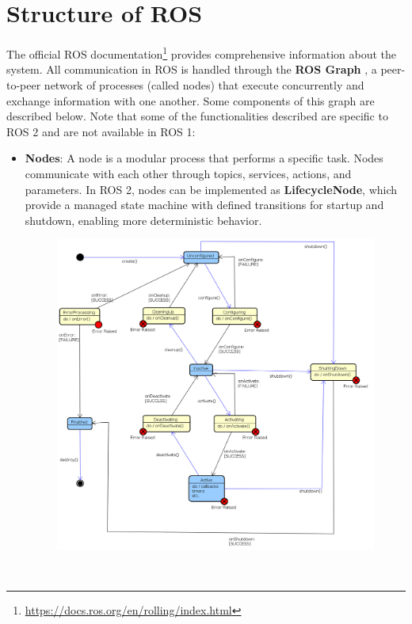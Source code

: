 \section{Structure of ROS}
The official ROS documentation\footnote{\href{https://docs.ros.org/en/rolling/index.html}{https://docs.ros.org/en/rolling/index.html}} provides comprehensive information about the system.  All communication in ROS is handled through the \textbf{ROS Graph} , a peer-to-peer network of processes (called nodes) that execute concurrently and exchange information with one another. Some components of this graph are described below. Note that some of the functionalities described are specific to ROS 2 and are not available in ROS 1:
\begin{itemize}
	\item \textbf{Nodes}: A node is a modular process that performs a specific task. Nodes communicate with each other through topics, services, actions, and parameters. In ROS 2, nodes can be implemented as \textbf{LifecycleNode}\label{LifecycleNode}, which provide a managed state machine with defined transitions for startup and shutdown, enabling more deterministic behavior.
	\begin{figure}[h]
	\centering
	\includegraphics[width=1\linewidth]{img/life_cycle_sm_nf.png}
	\end{figure}\\

\end{itemize}
